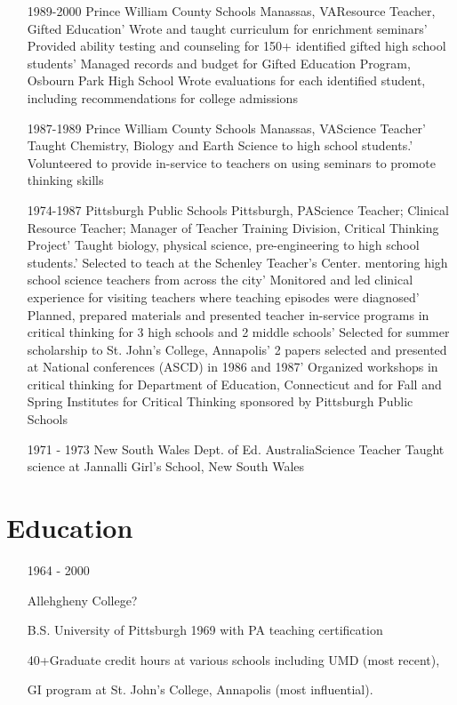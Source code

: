 \documentclass[fullpage,12pt]{article}
\begin{document}
\begin{itemize}

\item[1989-2000]
	Prince William County Schools	Manassas,
VAResource Teacher, Gifted Education'	Wrote and taught curriculum
for enrichment seminars'	Provided ability testing and
counseling for 150+ identified gifted high school students'
Managed records and budget for Gifted Education Program,     Osbourn
Park High School     Wrote evaluations for each identified student,
including recommendations      for college admissions   

\item[1987-1989]
	Prince William County Schools	Manassas,
VAScience Teacher'	Taught Chemistry, Biology and Earth Science to
high school students.'	Volunteered to provide in-service to teachers
on using seminars to promote thinking skills

\item[1974-1987]
	Pittsburgh Public Schools	Pittsburgh,
PAScience Teacher; Clinical Resource Teacher; Manager of  Teacher
Training Division, Critical Thinking Project'	Taught biology,
physical science, pre-engineering to high school students.'
Selected to teach at the Schenley Teacher's Center. mentoring high
school science teachers from across the city'	Monitored and led
clinical experience for visiting teachers where teaching episodes were
diagnosed'	Planned, prepared materials and presented teacher
in-service programs in critical thinking for 3 high schools and 2
middle schools'	Selected for summer scholarship to St. John's College,
Annapolis'	2 papers selected and presented at National
conferences (ASCD) in 1986 and 1987'	Organized workshops in
critical thinking for Department of Education, Connecticut and for
Fall and Spring Institutes for Critical Thinking sponsored by
Pittsburgh Public Schools

\item[1971 - 1973]
                   New South
Wales Dept. of Ed.       AustraliaScience Teacher      Taught science
at Jannalli Girl's School, New South Wales 

\end{itemize}

\section{Education}

\begin{itemize}

\item[1964 - 2000]

Allehgheny College?

	B.S. University of Pittsburgh 1969
with PA teaching certification

	40+Graduate credit hours at various
schools including UMD (most recent), 

GI program at St. John's College,
Annapolis (most influential).

\end{itemize}
\end{document}
